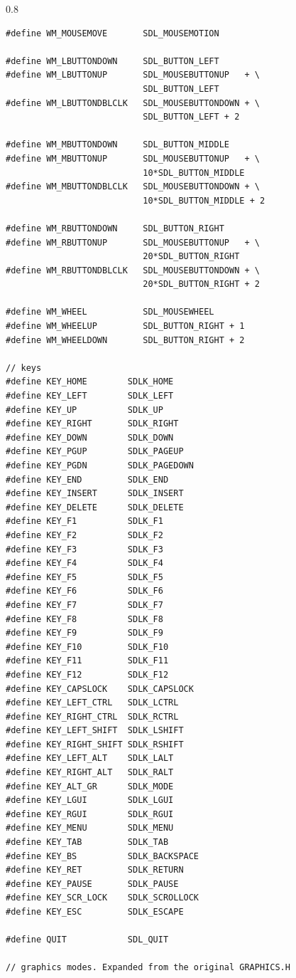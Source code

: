 \documentclass[a4paper,12pt]{article}
\newenvironment{margins}[2]
{ %
\begin{list}{}
{
\setlength{\leftmargin}{#1}
\setlength{\rightmargin}{#2}
} \item
} %
{\end{list}}
\begin{document}
\begin{margins}{-0.5cm}{-0.5cm}
\begin{spacing}{0.8}
\begin{lstlisting}
#define WM_MOUSEMOVE       SDL_MOUSEMOTION

#define WM_LBUTTONDOWN     SDL_BUTTON_LEFT
#define WM_LBUTTONUP       SDL_MOUSEBUTTONUP   + \
                           SDL_BUTTON_LEFT
#define WM_LBUTTONDBLCLK   SDL_MOUSEBUTTONDOWN + \
                           SDL_BUTTON_LEFT + 2

#define WM_MBUTTONDOWN     SDL_BUTTON_MIDDLE
#define WM_MBUTTONUP       SDL_MOUSEBUTTONUP   + \
                           10*SDL_BUTTON_MIDDLE
#define WM_MBUTTONDBLCLK   SDL_MOUSEBUTTONDOWN + \
                           10*SDL_BUTTON_MIDDLE + 2

#define WM_RBUTTONDOWN     SDL_BUTTON_RIGHT
#define WM_RBUTTONUP       SDL_MOUSEBUTTONUP   + \
                           20*SDL_BUTTON_RIGHT
#define WM_RBUTTONDBLCLK   SDL_MOUSEBUTTONDOWN + \
                           20*SDL_BUTTON_RIGHT + 2

#define WM_WHEEL           SDL_MOUSEWHEEL
#define WM_WHEELUP         SDL_BUTTON_RIGHT + 1
#define WM_WHEELDOWN       SDL_BUTTON_RIGHT + 2

// keys
#define KEY_HOME        SDLK_HOME
#define KEY_LEFT        SDLK_LEFT
#define KEY_UP          SDLK_UP
#define KEY_RIGHT       SDLK_RIGHT
#define KEY_DOWN        SDLK_DOWN
#define KEY_PGUP        SDLK_PAGEUP
#define KEY_PGDN        SDLK_PAGEDOWN
#define KEY_END         SDLK_END
#define KEY_INSERT      SDLK_INSERT
#define KEY_DELETE      SDLK_DELETE
#define KEY_F1          SDLK_F1
#define KEY_F2          SDLK_F2
#define KEY_F3          SDLK_F3
#define KEY_F4          SDLK_F4
#define KEY_F5          SDLK_F5
#define KEY_F6          SDLK_F6
#define KEY_F7          SDLK_F7
#define KEY_F8          SDLK_F8
#define KEY_F9          SDLK_F9
#define KEY_F10         SDLK_F10
#define KEY_F11         SDLK_F11
#define KEY_F12         SDLK_F12
#define KEY_CAPSLOCK    SDLK_CAPSLOCK
#define KEY_LEFT_CTRL   SDLK_LCTRL
#define KEY_RIGHT_CTRL  SDLK_RCTRL
#define KEY_LEFT_SHIFT  SDLK_LSHIFT
#define KEY_RIGHT_SHIFT SDLK_RSHIFT
#define KEY_LEFT_ALT    SDLK_LALT
#define KEY_RIGHT_ALT   SDLK_RALT
#define KEY_ALT_GR      SDLK_MODE
#define KEY_LGUI        SDLK_LGUI
#define KEY_RGUI        SDLK_RGUI
#define KEY_MENU        SDLK_MENU
#define KEY_TAB         SDLK_TAB
#define KEY_BS          SDLK_BACKSPACE
#define KEY_RET         SDLK_RETURN
#define KEY_PAUSE       SDLK_PAUSE
#define KEY_SCR_LOCK    SDLK_SCROLLOCK
#define KEY_ESC         SDLK_ESCAPE

#define QUIT            SDL_QUIT

// graphics modes. Expanded from the original GRAPHICS.H


\end{lstlisting}
\end{spacing}
\end{margins}
\end{document}

